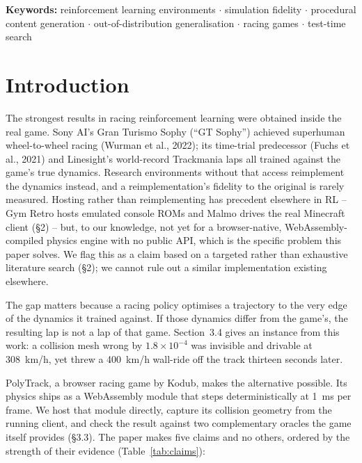 \documentclass[11pt]{article}
\begin{document}
\noindent\textbf{Keywords:} reinforcement learning environments $\cdot$ simulation fidelity $\cdot$ procedural content generation $\cdot$ out-of-distribution generalisation $\cdot$ racing games $\cdot$ test-time search

\section{Introduction}

The strongest results in racing reinforcement learning were obtained inside the real game. Sony AI's Gran Turismo Sophy (``GT Sophy'') achieved superhuman wheel-to-wheel racing (Wurman et al., 2022); its time-trial predecessor (Fuchs et al., 2021) and Linesight's world-record Trackmania laps all trained against the game's true dynamics. Research environments without that access reimplement the dynamics instead, and a reimplementation's fidelity to the original is rarely measured. Hosting rather than reimplementing has precedent elsewhere in RL -- Gym Retro hosts emulated console ROMs and Malmo drives the real Minecraft client (\S2) -- but, to our knowledge, not yet for a browser-native, WebAssembly-compiled physics engine with no public API, which is the specific problem this paper solves. We flag this as a claim based on a targeted rather than exhaustive literature search (\S2); we cannot rule out a similar implementation existing elsewhere.

The gap matters because a racing policy optimises a trajectory to the very edge of the dynamics it trained against. If those dynamics differ from the game's, the resulting lap is not a lap of that game. Section~3.4 gives an instance from this work: a collision mesh wrong by $1.8 \times 10^{-4}$ was invisible and drivable at 308~km/h, yet threw a 400~km/h wall-ride off the track thirteen seconds later.

PolyTrack, a browser racing game by Kodub, makes the alternative possible. Its physics ships as a WebAssembly module that steps deterministically at 1~ms per frame. We host that module directly, capture its collision geometry from the running client, and check the result against two complementary oracles the game itself provides (\S3.3). The paper makes five claims and no others, ordered by the strength of their evidence (Table~\ref{tab:claims}):
\end{document}

